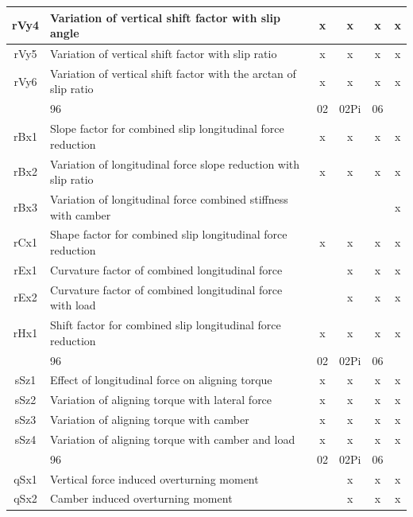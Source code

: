 \begin{center}
\begin{longtable}[c]{|c|p{4in}|cccc|}
			rVy4	&Variation of vertical shift factor with slip angle	&x	&x	&x	&x\\ \hline
			rVy5	&Variation of vertical shift factor with slip ratio	&x	&x 	&x	&x\\ \hline
			rVy6	&Variation of vertical shift factor with the arctan of slip ratio	&x &x	&x	&x\\ \hline
			\rowcolor{ttblue}\multicolumn{2}{|c|}{\cellcolor{ttblue}\textbf{Combined Longitudinal}}&96&	02&	02Pi&	06 \\ \hline
			rBx1	&Slope factor for combined slip longitudinal force reduction	&x	&x 	&x	&x\\ \hline
			rBx2	&Variation of longitudinal force slope reduction with slip ratio	&x 	&x	&x	&x\\ \hline
			rBx3	&Variation of longitudinal force combined stiffness with camber				&&&&x\\ \hline
			rCx1	&Shape factor for combined slip longitudinal force reduction	&x &x	&x	&x\\ \hline
			rEx1	&Curvature factor of combined longitudinal force		&&x	&x &x\\ \hline
			rEx2	&Curvature factor of combined longitudinal force with load		&&x	 &x &x\\ \hline
			rHx1	&Shift factor for combined slip longitudinal force reduction	&x	&x	&x	&x\\ \hline
			\rowcolor{ttblue}\multicolumn{2}{|c|}{\cellcolor{ttblue}\textbf{Combined Aligning Torque}}&96&	02& 	02Pi&	06 \\ \hline
			sSz1	&Effect of longitudinal force on aligning torque	&x	&x 	&x	&x\\ \hline
			sSz2	&Variation of aligning torque with lateral force	&x	&x 	&x	&x\\ \hline
			sSz3	&Variation of aligning torque with camber	&x	&x	&x &x	\\ \hline
			sSz4	&Variation of aligning torque with camber and load	&x &x		&x	&x\\ \hline
			\rowcolor{ttblue}\multicolumn{2}{|c|}{\cellcolor{ttblue}\textbf{Overturning Moment}}&96&	02& 02Pi&	06 \\ \hline
			qSx1	&Vertical force induced overturning moment		&&x	&x 	&x\\ \hline
			qSx2	&Camber induced overturning moment		&&x	&x 	&x\\ \hline

\end{longtable}
\end{center}
